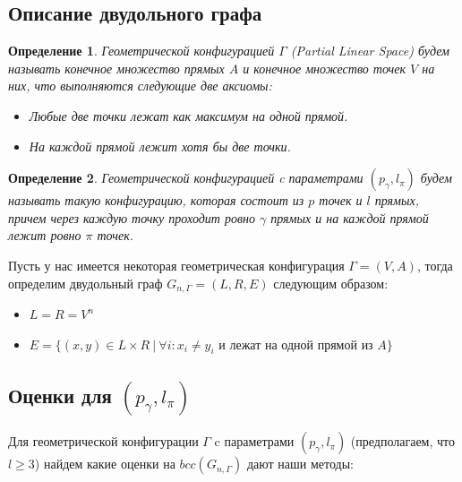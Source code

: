 \documentclass[a4paper]{article}
\newtheorem*{mdefinition}{Определение}
\begin{document}
\setcounter{subsection}{0}
\subsection{Описание двудольного графа}
\begin{mdefinition}
    Геометрической конфигурацией $\Gamma$ (Partial Linear Space) будем называть конечное множество 
    прямых $A$ и конечное множество точек $V$ на них, что выполняются следующие две аксиомы:
    \begin{itemize}[noitemsep]
        \item Любые две точки лежат как максимум на одной прямой.
        \item На каждой прямой лежит хотя бы две точки.
    \end{itemize}
\end{mdefinition}

\begin{mdefinition}
    Геометрической конфигурацией c параметрами $(p_{\gamma}, l_{\pi})$ будем называть такую конфигурацию, которая
    состоит из $p$ точек и $l$ прямых, причем через каждую точку проходит ровно $\gamma$ прямых и на 
    каждой прямой лежит ровно $\pi$ точек. 
\end{mdefinition}

Пусть у нас имеется некоторая геометрическая конфигурация $\Gamma = (V, A)$, тогда определим двудольный 
граф $G_{n,\Gamma} = (L, R, E)$ следующим образом:
\begin{itemize}[noitemsep]
    \item $L = R = V^n$
    \item $E = \{(x, y)\in L\times R\ |\ \forall i: x_i \neq y_i$ и лежат на одной прямой из $A\}$
\end{itemize}

\subsection{Оценки для $(p_{\gamma}, l_{\pi})$}

Для геометрической конфигурации $\Gamma$ c параметрами $(p_{\gamma}, l_{\pi})$ (предполагаем, что $l \geq 3$) найдем какие 
оценки на $bcc(G_{n,\Gamma})$ дают наши методы:
\end{document}
